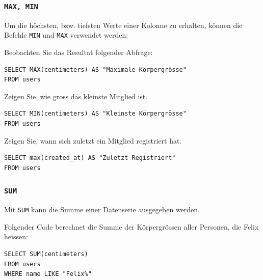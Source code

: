 \subsubsection{\texorpdfstring{\lstinline[style=sql]|MAX, MIN|}{MAX, MIN}}

Um die höchsten, bzw. tiefsten Werte einer Kolonne zu erhalten, können die Befehle \lstinline[style=sql]|MIN| und \lstinline[style=sql]|MAX| verwendet werden:

\begin{myexample}
Beobachten Sie das Resultat folgender Abfrage:

\begin{lstlisting}[style=sql]
SELECT MAX(centimeters) AS "Maximale Körpergrösse" 
FROM users
\end{lstlisting}
\end{myexample}

\begin{myexercise}
  Zeigen Sie, wie gross das kleinste Mitglied ist.
  \begin{myanswer}
    \begin{lstlisting}[style=sql]
SELECT MIN(centimeters) AS "Kleinste Körpergrösse"
FROM users
\end{lstlisting}
  \end{myanswer}
\end{myexercise}
\begin{myexercise}
  Zeigen Sie, wann sich zuletzt ein Mitglied registriert hat.
  \begin{myanswer}
    \begin{lstlisting}[style=sql]
SELECT max(created_at) AS "Zuletzt Registriert"
FROM users
\end{lstlisting}
  \end{myanswer}
\end{myexercise}


\subsubsection{\texorpdfstring{\lstinline[style=sql]|SUM|}{SUM}}

Mit \lstinline[style=sql]|SUM| kann die Summe einer Datenserie ausgegeben werden.

\begin{myexample}
Folgender Code berechnet die Summe der Körpergrössen aller Personen, die Felix heissen:

\begin{lstlisting}[style=sql]
SELECT SUM(centimeters) 
FROM users 
WHERE name LIKE "Felix%"
\end{lstlisting}
\end{myexample}


